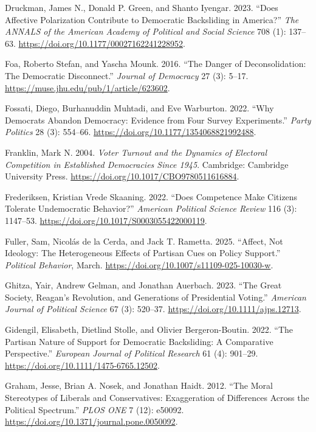 \documentclass[
  10pt,
  letterpaper,
  DIV=11,
  numbers=noendperiod]{scrartcl}
\newlength{\cslhangindent}
\newenvironment{CSLReferences}[2] %
 {\begin{list}{}{%
  \setlength{\itemindent}{0pt}
  \setlength{\leftmargin}{0pt}
  \setlength{\parsep}{0pt}
  \ifodd #1
   \setlength{\leftmargin}{\cslhangindent}
   \setlength{\itemindent}{-1\cslhangindent}
  \fi
  \setlength{\itemsep}{#2\baselineskip}}}
 {\end{list}}
\begin{document}
\begin{CSLReferences}{1}{0}
Druckman, James N., Donald P. Green, and Shanto Iyengar. 2023. {``Does
Affective Polarization Contribute to Democratic Backsliding in
America?''} \emph{The ANNALS of the American Academy of Political and
Social Science} 708 (1): 137--63.
\url{https://doi.org/10.1177/00027162241228952}.

Foa, Roberto Stefan, and Yascha Mounk. 2016. {``The Danger of
Deconsolidation: The Democratic Disconnect.''} \emph{Journal of
Democracy} 27 (3): 5--17.
\url{https://muse.jhu.edu/pub/1/article/623602}.

Fossati, Diego, Burhanuddin Muhtadi, and Eve Warburton. 2022. {``Why
Democrats Abandon Democracy: Evidence from Four Survey Experiments.''}
\emph{Party Politics} 28 (3): 554--66.
\url{https://doi.org/10.1177/1354068821992488}.

Franklin, Mark N. 2004. \emph{Voter Turnout and the Dynamics of
Electoral Competition in Established Democracies Since 1945}. Cambridge:
Cambridge University Press.
\url{https://doi.org/10.1017/CBO9780511616884}.

Frederiksen, Kristian Vrede Skaaning. 2022. {``Does Competence Make
Citizens Tolerate Undemocratic Behavior?''} \emph{American Political
Science Review} 116 (3): 1147--53.
\url{https://doi.org/10.1017/S0003055422000119}.

Fuller, Sam, Nicolás de la Cerda, and Jack T. Rametta. 2025. {``Affect,
Not Ideology: The Heterogeneous Effects of Partisan Cues on Policy
Support.''} \emph{Political Behavior}, March.
\url{https://doi.org/10.1007/s11109-025-10030-w}.

Ghitza, Yair, Andrew Gelman, and Jonathan Auerbach. 2023. {``The Great
Society, Reagan's Revolution, and Generations of Presidential Voting.''}
\emph{American Journal of Political Science} 67 (3): 520--37.
\url{https://doi.org/10.1111/ajps.12713}.

Gidengil, Elisabeth, Dietlind Stolle, and Olivier Bergeron-Boutin. 2022.
{``The Partisan Nature of Support for Democratic Backsliding: A
Comparative Perspective.''} \emph{European Journal of Political
Research} 61 (4): 901--29.
\url{https://doi.org/10.1111/1475-6765.12502}.

Graham, Jesse, Brian A. Nosek, and Jonathan Haidt. 2012. {``The Moral
Stereotypes of Liberals and Conservatives: Exaggeration of Differences
Across the Political Spectrum.''} \emph{PLOS ONE} 7 (12): e50092.
\url{https://doi.org/10.1371/journal.pone.0050092}.


\end{CSLReferences}
\end{document}
